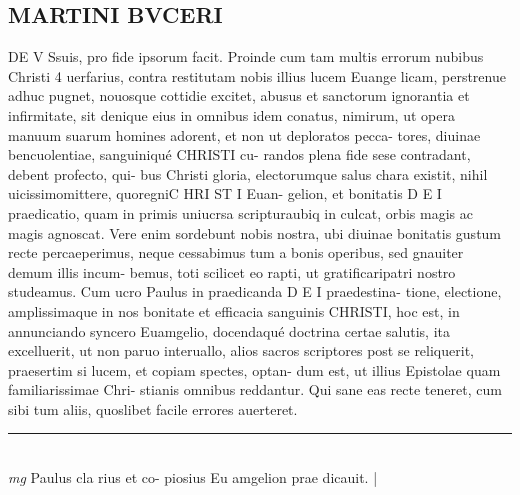 \documentclass{article}
\begin{document}
\begin{pages}
\section*{MARTINI BVCERI }\pstart DE V Ssuis, pro fide ipsorum facit.  \pend\pstart Proinde cum tam multis errorum nubibus Christi 4 uerfarius, contra restitutam nobis illius lucem Euange licam, perstrenue adhuc pugnet, nouosque cottidie excitet, abusus et sanctorum ignorantia et infirmitate, sit denique eius in omnibus idem conatus, nimirum, ut opera manuum suarum homines adorent, et non ut deploratos pecca- tores, diuinae bencuolentiae, sanguiniqué CHRISTI cu- randos plena fide sese contradant, debent profecto, qui- bus Christi gloria, electorumque salus chara existit, nihil uicissimomittere, quoregniC HRI ST I Euan- gelion, et bonitatis D E I praedicatio, quam in primis uniucrsa scripturaubiq in culcat, orbis magis ac magis agnoscat.  Vere enim sordebunt nobis nostra, ubi diuinae bonitatis gustum recte percaeperimus, neque cessabimus tum a bonis operibus, sed gnauiter demum illis incum- bemus, toti scilicet eo rapti, ut gratificaripatri nostro studeamus.  \pend\pstart Cum ucro Paulus in praedicanda D E I praedestina- tione, electione, amplissimaque in nos bonitate et efficacia sanguinis CHRISTI, hoc est, in annunciando syncero Euamgelio, docendaqué doctrina certae salutis, ita excelluerit, ut non paruo interuallo, alios sacros scriptores post se reliquerit, praesertim si lucem, et copiam spectes, optan- dum est, ut illius Epistolae quam familiarissimae Chri- stianis omnibus reddantur. Qui sane eas recte teneret, cum sibi tum aliis, quoslibet facile errores auerteret.  \pend
\vspace{0.5cm}\noindent
\vspace{0.2cm}\rule{1cm}{0.2pt}\\ 
\hspace{0.2cm}\textit{mg}
\footnotesize Paulus cla rius et co- piosius Eu amgelion prae dicauit. 
\normalsize| 

\end{pages}
\end{document}
